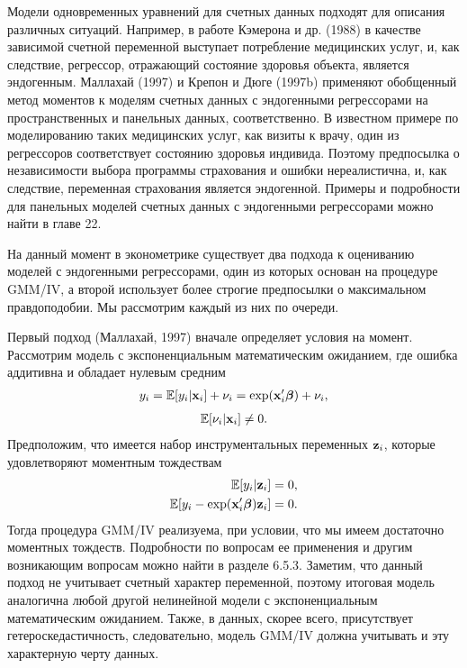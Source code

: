 \noindent
Модели одновременных уравнений для счетных данных подходят для описания различных ситуаций. Например, в работе Кэмерона и др. (1988) в качестве зависимой счетной переменной выступает потребление медицинских услуг, и, как следствие, регрессор, отражающий состояние здоровья объекта, является эндогенным. Маллахай (1997) и Крепон и Дюге (1997b) применяют обобщенный метод моментов к моделям счетных данных с эндогенными регрессорами на пространственных и панельных данных, соответственно. В известном примере по моделированию таких медицинских услуг, как визиты к врачу, один из регрессоров соответствует состоянию здоровья индивида. Поэтому предпосылка о независимости выбора программы страхования и ошибки нереалистична, и, как следствие, переменная страхования является эндогенной. Примеры и подробности для панельных моделей счетных данных с эндогенными регрессорами можно найти в главе 22.

На данный момент в эконометрике существует два подхода к оцениванию моделей с эндогенными регрессорами, один из которых основан на процедуре GMM/IV, а второй использует более строгие предпосылки о максимальном правдоподобии. Мы рассмотрим каждый из них по очереди.

Первый подход (Маллахай, 1997) вначале определяет условия на момент. Рассмотрим модель с экспоненциальным математическим ожиданием, где ошибка аддитивна и обладает нулевым средним
    \begin{align}\label{eq:20.26}
    y_i = \mathbb{E}[y_i|\mathbf{x}_i] + \nu_i = \exp(\mathbf{x}_i'\bm{\beta}) + \nu_i,
    \end{align}
    \begin{align}\label{eq:20.27}
    \mathbb{E}[\nu_i|\mathbf{x}_i] \ne 0.
    \end{align}
Предположим, что имеется набор инструментальных переменных $\mathbf{z}_i$, которые удовлетворяют моментным тождествам
    \begin{align}\label{eq:20.28}
    \mathbb{E}[y_i|\mathbf{z}_i]    &= 0, \\
    \mathbb{E}[y_i - \exp(\mathbf{x}_i'\bm{\beta})\mathbf{z}_i] &= 0. \notag
    \end{align}
Тогда процедура GMM/IV реализуема, при условии, что мы имеем достаточно моментных тождеств. Подробности по вопросам ее применения и другим возникающим вопросам можно найти в разделе 6.5.3. Заметим, что данный подход не учитывает счетный характер переменной, поэтому итоговая модель аналогична любой другой нелинейной модели с экспоненциальным математическим ожиданием. Также, в данных, скорее всего, присутствует гетероскедастичность, следовательно, модель GMM/IV должна учитывать и эту характерную черту данных.

